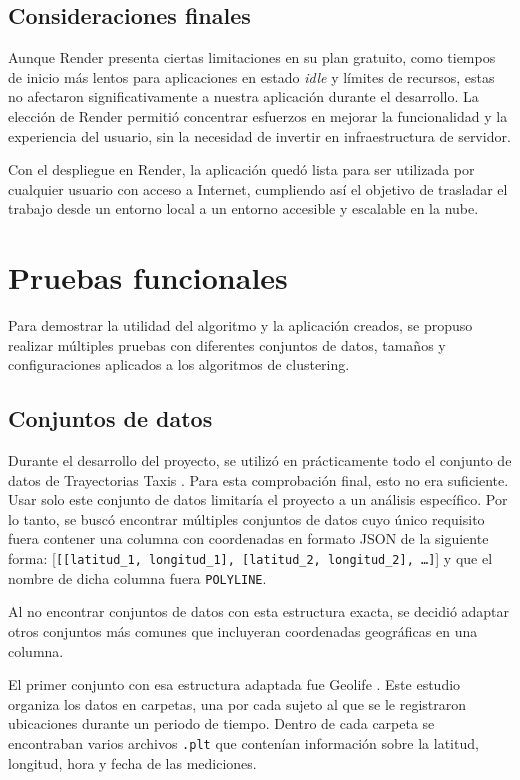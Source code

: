 \subsection{Consideraciones finales}

Aunque Render presenta ciertas limitaciones en su plan gratuito, como tiempos de inicio más lentos para aplicaciones en estado \textit{idle} y límites de recursos, estas no afectaron significativamente a nuestra aplicación durante el desarrollo. La elección de Render permitió concentrar esfuerzos en mejorar la funcionalidad y la experiencia del usuario, sin la necesidad de invertir en infraestructura de servidor.

Con el despliegue en Render, la aplicación quedó lista para ser utilizada por cualquier usuario con acceso a Internet, cumpliendo así el objetivo de trasladar el trabajo desde un entorno local a un entorno accesible y escalable en la nube.

\section{Pruebas funcionales}

Para demostrar la utilidad del algoritmo y la aplicación creados, se propuso realizar múltiples pruebas con diferentes conjuntos de datos, tamaños y configuraciones aplicados a los algoritmos de clustering.

\subsection{Conjuntos de datos}

Durante el desarrollo del proyecto, se utilizó en prácticamente todo el conjunto de datos de Trayectorias Taxis \cite{trayectorias_taxis}. Para esta comprobación final, esto no era suficiente. Usar solo este conjunto de datos limitaría el proyecto a un análisis específico. Por lo tanto, se buscó encontrar múltiples conjuntos de datos cuyo único requisito fuera contener una columna con coordenadas en formato JSON de la siguiente forma: 
[\texttt{[[latitud\_1, longitud\_1], [latitud\_2, longitud\_2], \dots]}]
y que el nombre de dicha columna fuera \texttt{POLYLINE}.

Al no encontrar conjuntos de datos con esta estructura exacta, se decidió adaptar otros conjuntos más comunes que incluyeran coordenadas geográficas en una columna. 

El primer conjunto con esa estructura adaptada fue Geolife \cite{geolife_trajectories}. Este estudio organiza los datos en carpetas, una por cada sujeto al que se le registraron ubicaciones durante un periodo de tiempo. Dentro de cada carpeta se encontraban varios archivos \texttt{.plt} que contenían información sobre la latitud, longitud, hora y fecha de las mediciones. 

